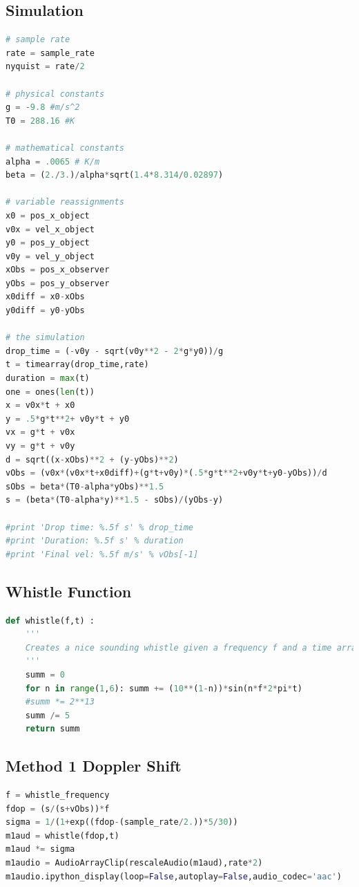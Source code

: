 \documentclass[%
 reprint,
 amsmath,amssymb,
 aps,
]{revtex4-1}
\begin{document}
\subsection{\label{sec:codesim}Simulation}

\begin{lstlisting}[label=lst:sim,language=Python]
# sample rate
rate = sample_rate
nyquist = rate/2

# physical constants
g = -9.8 #m/s^2
T0 = 288.16 #K

# mathematical constants
alpha = .0065 # K/m
beta = (2./3.)/alpha*sqrt(1.4*8.314/0.02897)

# variable reassignments
x0 = pos_x_object
v0x = vel_x_object
y0 = pos_y_object
v0y = vel_y_object
xObs = pos_x_observer
yObs = pos_y_observer
x0diff = x0-xObs
y0diff = y0-yObs

# the simulation
drop_time = (-v0y - sqrt(v0y**2 - 2*g*y0))/g
t = timearray(drop_time,rate)
duration = max(t)
one = ones(len(t))
x = v0x*t + x0
y = .5*g*t**2+ v0y*t + y0
vx = g*t + v0x
vy = g*t + v0y
d = sqrt((x-xObs)**2 + (y-yObs)**2)
vObs = (v0x*(v0x*t+x0diff)+(g*t+v0y)*(.5*g*t**2+v0y*t+y0-yObs))/d
sObs = beta*(T0-alpha*yObs)**1.5
s = (beta*(T0-alpha*y)**1.5 - sObs)/(yObs-y)

#print 'Drop time: %.5f s' % drop_time
#print 'Duration: %.5f s' % duration
#print 'Final vel: %.5f m/s' % vObs[-1]
\end{lstlisting}

\subsection{\label{sec:codewhistle}Whistle Function}

\begin{lstlisting}[label=lst:whistle,language=Python]
def whistle(f,t) :
    '''
    Creates a nice sounding whistle given a frequency f and a time array t.
    '''
    summ = 0
    for n in range(1,6): summ += (10**(1-n))*sin(n*f*2*pi*t)
    #summ *= 2**13
    summ /= 5
    return summ
\end{lstlisting}

\subsection{\label{sec:codemethod1}Method 1 Doppler Shift}

\begin{lstlisting}[label=lst:method1,language=Python]
f = whistle_frequency
fdop = (s/(s+vObs))*f
sigma = 1/(1+exp((fdop-(sample_rate/2.))*5/30))
m1aud = whistle(fdop,t)
m1aud *= sigma
m1audio = AudioArrayClip(rescaleAudio(m1aud),rate*2)
m1audio.ipython_display(loop=False,autoplay=False,audio_codec='aac')
\end{lstlisting}
\end{document}
